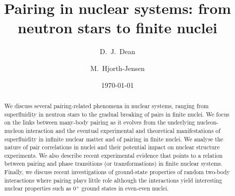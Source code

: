 \documentclass[rmp,preprint,aps,floatfix]{revtex4}
\begin{document}
\title{Pairing in nuclear systems: from neutron stars to finite nuclei}
\author{D.~J.~Dean}
\author{M.~Hjorth-Jensen}
\date{\today}
\begin{abstract}

We discuss several pairing-related
phenomena in nuclear systems, ranging from superfluidity
in neutron stars to the gradual breaking of pairs in finite nuclei.
We focus on the links between
many-body pairing as it evolves from the underlying
nucleon-nucleon interaction
and the eventual experimental and theoretical manifestations
of superfluidity in infinite nuclear matter and
of pairing in finite nuclei.
We analyse the nature of pair correlations
in nuclei and their potential impact on nuclear structure
experiments.  We  also describe recent experimental evidence that
points to a relation between pairing and
phase transitions (or transformations) in finite nuclear
systems.  Finally, we discuss recent investigations of ground-state
properties of random two-body interactions where pairing plays little
role although
the interactions yield interesting nuclear properties such as 0$^+$
ground states in even-even nuclei.
   

\end{abstract}

\maketitle
\end{document}
